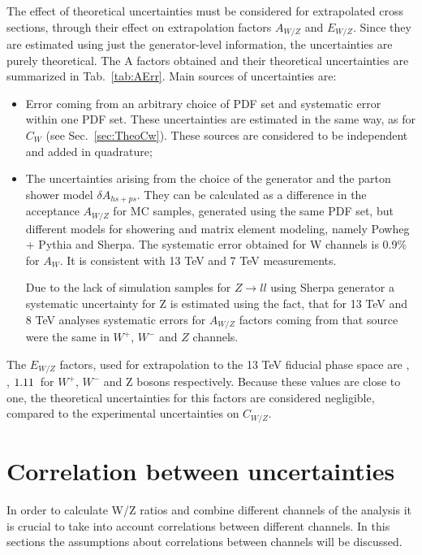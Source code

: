 The effect of theoretical uncertainties must be considered for extrapolated cross sections, through their effect on extrapolation factors $A_{W/Z}$ and $E_{W/Z}$. Since they are estimated using just the generator-level information, the uncertainties are purely theoretical.
The A factors obtained and their theoretical uncertainties are summarized in Tab.~\ref{tab:AErr}. Main sources of uncertainties are:
\begin{itemize}
\item  Error coming from an arbitrary choice of PDF set and systematic error within one PDF set. These uncertainties are estimated in the same way, as for $C_W$ (see Sec.~\ref{sec:TheoCw}). These sources are considered to be independent and added in quadrature;
\item The uncertainties arising from the choice of the generator and the parton shower model $\delta A_{hs+ps}$. They can be calculated as a difference in the acceptance  $A_{W/Z}$ for MC samples, generated using the same PDF set, but different models for showering and matrix element modeling, namely Powheg + Pythia and Sherpa. The systematic error obtained for W channels is 0.9\% for $A_{W}$. It is consistent with 13 TeV and 7 TeV measurements.

 Due to the lack of simulation samples for $Z\to ll$ using Sherpa generator a systematic uncertainty for Z is estimated using the fact, that for 13 TeV and 8 TeV analyses  systematic errors for $A_{W/Z}$ factors coming from that source were the same in $W^{+}$, $W^-$ and $Z$ channels.
\end{itemize}

 The $E_{W/Z}$ factors, used for extrapolation to the 13 TeV fiducial phase space are \WplusenuE, \WminenuE, $1.11\, $  for $W^{+}$, $W^-$ and Z bosons respectively. Because these values are close to one, the theoretical uncertainties for this factors are considered negligible, compared to the experimental uncertainties on $C_{W/Z}$.


 
\section{Correlation between uncertainties}\label{sec:Cor}

In order to calculate W/Z ratios and combine different channels of the analysis it is crucial to take into account correlations between different channels. In this sections the assumptions about correlations between channels will be discussed.

